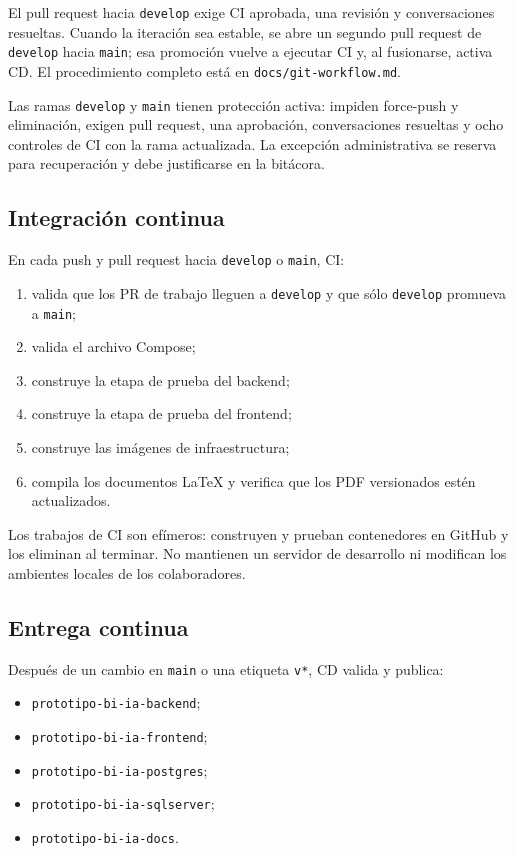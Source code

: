\documentclass[11pt,letterpaper]{article}
\newcommand{\file}[1]{\texttt{#1}}
\begin{document}
El pull request hacia \file{develop} exige CI aprobada, una revisión y conversaciones resueltas. Cuando la iteración sea estable, se abre un segundo pull request de \file{develop} hacia \file{main}; esa promoción vuelve a ejecutar CI y, al fusionarse, activa CD. El procedimiento completo está en \file{docs/git-workflow.md}.

Las ramas \file{develop} y \file{main} tienen protección activa: impiden force-push y eliminación, exigen pull request, una aprobación, conversaciones resueltas y ocho controles de CI con la rama actualizada. La excepción administrativa se reserva para recuperación y debe justificarse en la bitácora.

\subsection{Integración continua}

En cada push y pull request hacia \file{develop} o \file{main}, CI:

\begin{enumerate}
  \item valida que los PR de trabajo lleguen a \file{develop} y que sólo \file{develop} promueva a \file{main};
  \item valida el archivo Compose;
  \item construye la etapa de prueba del backend;
  \item construye la etapa de prueba del frontend;
  \item construye las imágenes de infraestructura;
  \item compila los documentos LaTeX y verifica que los PDF versionados estén actualizados.
\end{enumerate}

Los trabajos de CI son efímeros: construyen y prueban contenedores en GitHub y los eliminan al terminar. No mantienen un servidor de desarrollo ni modifican los ambientes locales de los colaboradores.

\subsection{Entrega continua}

Después de un cambio en \file{main} o una etiqueta \file{v*}, CD valida y publica:

\begin{itemize}
  \item \file{prototipo-bi-ia-backend};
  \item \file{prototipo-bi-ia-frontend};
  \item \file{prototipo-bi-ia-postgres};
  \item \file{prototipo-bi-ia-sqlserver};
  \item \file{prototipo-bi-ia-docs}.
\end{itemize}
\end{document}
